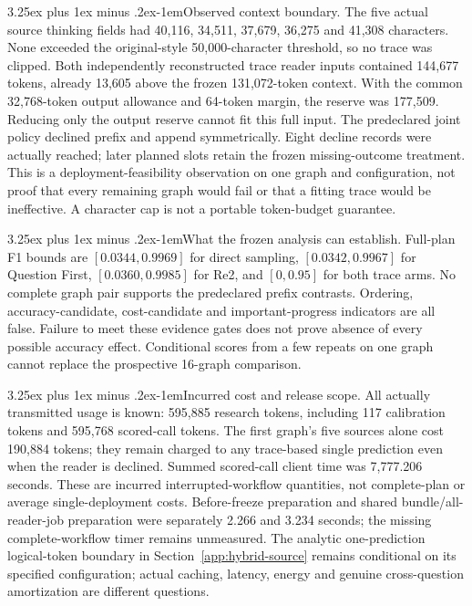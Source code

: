 \documentclass[10pt]{article}
\makeatletter
\renewcommand\paragraph{\@startsection{paragraph}{4}{\parindent}%
  {3.25ex plus 1ex minus .2ex}{-1em}{\normalfont\normalsize\bfseries}}
\makeatother
\begin{document}
\paragraph{Observed context boundary.} The five actual source thinking fields had 40,116, 34,511, 37,679, 36,275 and 41,308 characters. None exceeded the original-style 50,000-character threshold, so no trace was clipped. Both independently reconstructed trace reader inputs contained 144,677 tokens, already 13,605 above the frozen 131,072-token context. With the common 32,768-token output allowance and 64-token margin, the reserve was 177,509. Reducing only the output reserve cannot fit this full input. The predeclared joint policy declined prefix and append symmetrically. Eight decline records were actually reached; later planned slots retain the frozen missing-outcome treatment. This is a deployment-feasibility observation on one graph and configuration, not proof that every remaining graph would fail or that a fitting trace would be ineffective. A character cap is not a portable token-budget guarantee.

\paragraph{What the frozen analysis can establish.} Full-plan F1 bounds are $[0.0344,0.9969]$ for direct sampling, $[0.0342,0.9967]$ for Question First, $[0.0360,0.9985]$ for Re2, and $[0,0.95]$ for both trace arms. No complete graph pair supports the predeclared prefix contrasts. Ordering, accuracy-candidate, cost-candidate and important-progress indicators are all false. Failure to meet these evidence gates does not prove absence of every possible accuracy effect. Conditional scores from a few repeats on one graph cannot replace the prospective 16-graph comparison.

\paragraph{Incurred cost and release scope.} All actually transmitted usage is known: 595,885 research tokens, including 117 calibration tokens and 595,768 scored-call tokens. The first graph's five sources alone cost 190,884 tokens; they remain charged to any trace-based single prediction even when the reader is declined. Summed scored-call client time was 7,777.206 seconds. These are incurred interrupted-workflow quantities, not complete-plan or average single-deployment costs. Before-freeze preparation and shared bundle/all-reader-job preparation were separately 2.266 and 3.234 seconds; the missing complete-workflow timer remains unmeasured. The analytic one-prediction logical-token boundary in Section~\ref{app:hybrid-source} remains conditional on its specified configuration; actual caching, latency, energy and genuine cross-question amortization are different questions.
\end{document}
